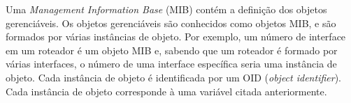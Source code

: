 	 Uma \textit{Management Information Base} (MIB) contém a definição dos objetos gerenciáveis. Os objetos gerenciáveis são conhecidos como objetos MIB, e são formados por várias instâncias de objeto. Por exemplo, um número de interface em um roteador é um objeto MIB e, sabendo que um roteador é formado por várias interfaces, o número de uma interface específica seria uma instância de objeto. Cada instância de objeto é identificada por um OID (\textit{object identifier}). Cada instância de objeto corresponde à uma variável citada anteriormente.